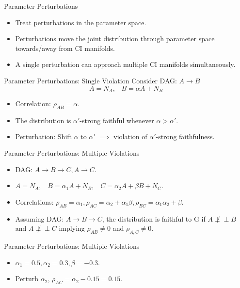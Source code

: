 \documentclass{beamer}
\def\ci{\perp\!\!\!\!\!\perp}
\begin{document}
\begin{frame}{Parameter Perturbations}
	\begin{itemize}
		\item Treat perturbations in the parameter space.
		\item Perturbations move the joint distribution through parameter space towards/away from CI manifolds.
		\item A single perturbation can approach multiple CI manifolds simultaneously.
	\end{itemize}
\end{frame}

\begin{frame}{Parameter Perturbations: Single Violation}
	Consider DAG: $ A \rightarrow B $
	$$ A = N_A, \;\;\; B = \alpha A + N_B $$
	\begin{itemize}
		\item Correlation: $ \rho_{AB} = \alpha $.
		\item The distribution is $ \alpha'$-strong faithful whenever $ \alpha > \alpha' $.
		\item Perturbation: Shift $ \alpha $ to $ \alpha' $ $ \implies $ violation of $ \alpha'$-strong faithfulness.
	\end{itemize}
\end{frame}

\begin{frame}{Parameter Perturbations: Multiple Violations}
	\begin{itemize}
		\item DAG: $ A \rightarrow B \rightarrow C, A \rightarrow C $.
		\item $ A = N_A, \;\;\; B = \alpha_1 A + N_B, \;\;\; C = \alpha_2 A + \beta B + N_C $.
		\item Correlations: $ \rho_{AB} = \alpha_1, \rho_{AC} = \alpha_2 + \alpha_1 \beta , \rho_{BC} = \alpha_1 \alpha_2 + \beta$.
		\item  Assuming DAG: $ A \rightarrow B \rightarrow C $, the distribution is faithful to G if $ A \not \ci B $ and $ A \not \ci C $ implying $ \rho_{AB} \ne 0 $ and $ \rho_{A,C} \ne 0 $.
	\end{itemize}
\end{frame}

\begin{frame}{Parameter Perturbations: Multiple Violations}
	\begin{itemize}
		\item $ \alpha_1 = 0.5, \alpha_2 = 0.3, \beta = -0.3 $.
		\item Perturb $ \alpha_2 $, $ \rho_{AC} = \alpha_2 - 0.15 = 0.15 $.
	\end{itemize}
\end{frame}
\end{document}
